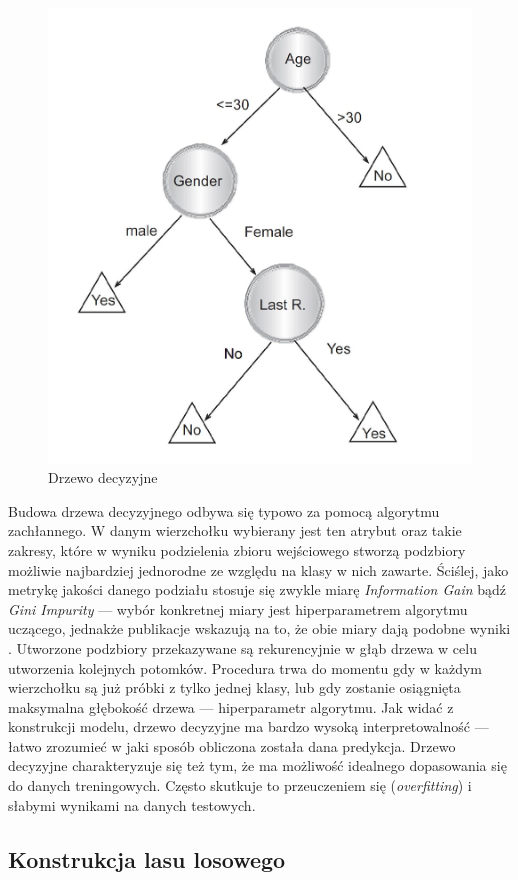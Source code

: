 \begin{figure}[H]
	\centering
	\includegraphics[width=0.6\linewidth]{images/chapter2/decision_tree.pdf}
	\caption{Drzewo decyzyjne \cite{rokach2007data}}
	\label{fig:decision-tree}
\end{figure}
Budowa drzewa decyzyjnego odbywa się typowo za pomocą algorytmu zachłannego. W danym wierzchołku wybierany jest ten atrybut oraz takie zakresy, które w wyniku podzielenia zbioru wejściowego stworzą podzbiory możliwie najbardziej jednorodne ze względu na klasy w nich zawarte. Ściślej, jako metrykę jakości danego podziału stosuje się zwykle miarę \textit{Information Gain} bądź \textit{Gini Impurity} --- wybór konkretnej miary jest hiperparametrem algorytmu uczącego, jednakże publikacje wskazują na to, że obie miary dają podobne wyniki \cite{tangirala2020evaluating}. Utworzone podzbiory przekazywane są rekurencyjnie w głąb drzewa w celu utworzenia kolejnych potomków. Procedura trwa do momentu gdy w każdym wierzchołku są już próbki z tylko jednej klasy, lub gdy zostanie osiągnięta maksymalna głębokość drzewa --- hiperparametr algorytmu.
Jak widać z konstrukcji modelu, drzewo decyzyjne ma bardzo wysoką interpretowalność --- łatwo zrozumieć w jaki sposób obliczona została dana predykcja. Drzewo decyzyjne charakteryzuje się też tym, że ma możliwość idealnego dopasowania się do danych treningowych. Często skutkuje to przeuczeniem się (\textit{overfitting}) i słabymi wynikami na danych testowych.

\subsection{Konstrukcja lasu losowego}

